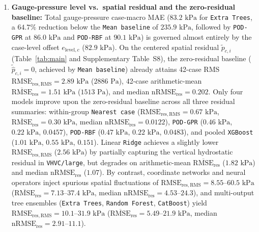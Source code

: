 \documentclass[11pt]{article}
\begin{document}
\begin{enumerate}
  \item \textbf{Gauge-pressure level vs.\ spatial residual and the zero-residual baseline:} Total gauge-pressure case-macro MAE ($83.2\text{ kPa}$ for \texttt{Extra Trees}, a $64.7\%$ reduction below the \texttt{Mean baseline} of $235.9\text{ kPa}$, followed by \texttt{POD-GPR} at $86.0\text{ kPa}$ and \texttt{POD-RBF} at $90.1\text{ kPa}$) is governed almost entirely by the case-level offset $e_{\mathrm{level},c}$ ($82.9\text{ kPa}$). On the centered spatial residual $\tilde{p}_{c,i}$ (Table~\ref{tab:main} and Supplementary Table~S8), the zero-residual baseline ($\tilde{\hat{p}}_{c,i}=0$, achieved by \texttt{Mean baseline}) already attains 42-case RMS $\mathrm{RMSE}_{\mathrm{res,RMS}} = 2.89\text{ kPa}$ ($2886\text{ Pa}$), 42-case arithmetic-mean $\overline{\mathrm{RMSE}}_{\mathrm{res}} = 1.51\text{ kPa}$ ($1513\text{ Pa}$), and median $\mathrm{nRMSE}_{\mathrm{res}} = 0.202$. Only four models improve upon the zero-residual baseline across all three residual summaries: within-group \texttt{Nearest case} ($\mathrm{RMSE}_{\mathrm{res,RMS}} = 0.67\text{ kPa}$, $\overline{\mathrm{RMSE}}_{\mathrm{res}} = 0.30\text{ kPa}$, median $\mathrm{nRMSE}_{\mathrm{res}} = 0.0122$), \texttt{POD-GPR} ($0.46\text{ kPa}$, $0.22\text{ kPa}$, $0.0457$), \texttt{POD-RBF} ($0.47\text{ kPa}$, $0.22\text{ kPa}$, $0.0483$), and pooled \texttt{XGBoost} ($1.01\text{ kPa}$, $0.55\text{ kPa}$, $0.151$). Linear \texttt{Ridge} achieves a slightly lower $\mathrm{RMSE}_{\mathrm{res,RMS}}$ ($2.56\text{ kPa}$) by partially capturing the vertical hydrostatic residual in \texttt{VHVC/large}, but degrades on arithmetic-mean $\overline{\mathrm{RMSE}}_{\mathrm{res}}$ ($1.82\text{ kPa}$) and median $\mathrm{nRMSE}_{\mathrm{res}}$ ($1.07$). By contrast, coordinate networks and neural operators inject spurious spatial fluctuations of $\mathrm{RMSE}_{\mathrm{res,RMS}} = 8.55\text{--}60.5\text{ kPa}$ ($\overline{\mathrm{RMSE}}_{\mathrm{res}} = 7.13\text{--}37.4\text{ kPa}$, median $\mathrm{nRMSE}_{\mathrm{res}} = 4.53\text{--}24.3$), and multi-output tree ensembles (\texttt{Extra Trees}, \texttt{Random Forest}, \texttt{CatBoost}) yield $\mathrm{RMSE}_{\mathrm{res,RMS}} = 10.1\text{--}31.9\text{ kPa}$ ($\overline{\mathrm{RMSE}}_{\mathrm{res}} = 5.49\text{--}21.9\text{ kPa}$, median $\mathrm{nRMSE}_{\mathrm{res}} = 2.91\text{--}11.1$).

\end{enumerate}
\end{document}
